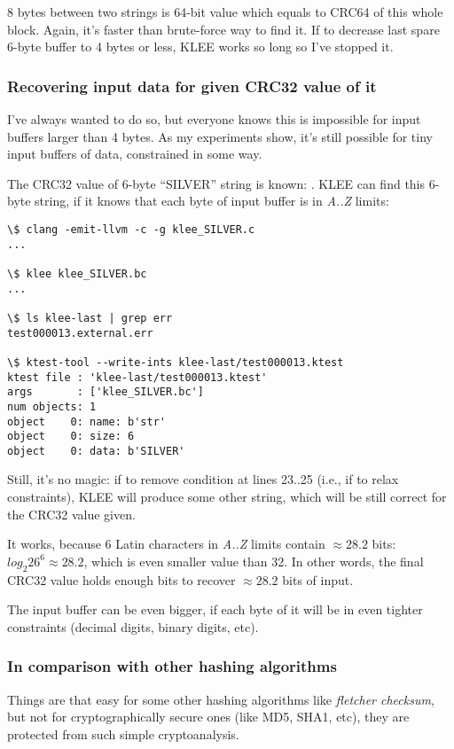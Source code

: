 8 bytes between two strings is 64-bit value which equals to CRC64 of this whole block.
Again, it's faster than brute-force way to find it.
If to decrease last spare 6-byte buffer to 4 bytes or less, KLEE works so long so I've stopped it.

\subsubsection{Recovering input data for given CRC32 value of it}

I've always wanted to do so, but everyone knows this is impossible for input buffers larger than 4 bytes.
As my experiments show, it's still possible for tiny input buffers of data, constrained in some way.

The CRC32 value of 6-byte ``SILVER'' string is known: .
KLEE can find this 6-byte string, if it knows that each byte of input buffer is in \textit{A..Z} limits:



\begin{lstlisting}
\$ clang -emit-llvm -c -g klee_SILVER.c
...

\$ klee klee_SILVER.bc
...

\$ ls klee-last | grep err
test000013.external.err

\$ ktest-tool --write-ints klee-last/test000013.ktest
ktest file : 'klee-last/test000013.ktest'
args       : ['klee_SILVER.bc']
num objects: 1
object    0: name: b'str'
object    0: size: 6
object    0: data: b'SILVER'
\end{lstlisting}

Still, it's no magic: if to remove condition at lines 23..25 (i.e., if to relax constraints),
KLEE will produce some other string, which will be still correct for the CRC32 value given.

It works, because 6 Latin characters in \textit{A..Z} limits contain $\approx 28.2$ bits:
$log_2{26^6} \approx 28.2$, which is even smaller value than 32.
In other words, the final CRC32 value holds enough bits to recover $\approx 28.2$ bits of input.

The input buffer can be even bigger, if each byte of it will be in even tighter %
constraints (decimal digits, binary digits, etc).

\subsubsection{In comparison with other hashing algorithms}

Things are that easy for some other hashing algorithms like \textit{fletcher checksum}, %
but not for cryptographically secure ones (like MD5, SHA1, etc), they are protected from such simple cryptoanalysis. %

